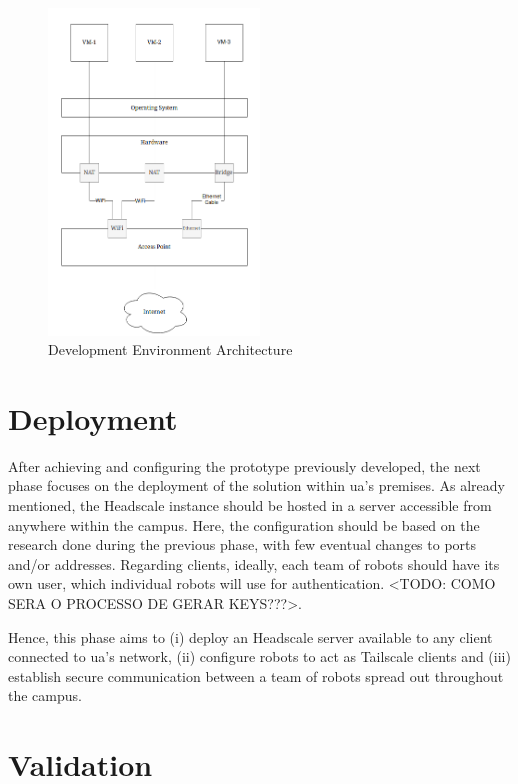 \documentclass[11pt,twoside,a4paper]{report}
\begin{document}
\begin{figure}[h]
\centering
\includegraphics[width=0.5\textwidth]{dev.png}
\caption{Development Environment Architecture}
\label{fig:sandbox}
\end{figure}


\section{Deployment}

After achieving and configuring the prototype previously developed, the next phase focuses on the deployment of the solution within \ac{ua}'s premises. As already mentioned, the Headscale instance should be hosted in a server accessible from anywhere within the campus. Here, the configuration should be based on the research done during the previous phase, with few eventual changes to ports and/or addresses. Regarding clients, ideally, each team of robots should have its own user, which individual robots will use for authentication. <TODO: COMO SERA O PROCESSO DE GERAR KEYS???>.

Hence, this phase aims to (i) deploy an Headscale server available to any client connected to \ac{ua}'s network, (ii) configure robots to act as Tailscale clients and (iii) establish secure communication between a team of robots spread out throughout the campus.


\section{Validation}
\label{sec:metvalidation}
\end{document}
